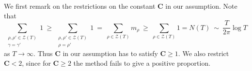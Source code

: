 \documentclass[11pt]{amsart}
\theoremstyle{remark}
\theoremstyle{plain}
\numberwithin{equation}{section}
\begin{document}
We first remark on the restrictions on the constant $\mathbf{C}$ in our assumption.
Note that
\begin{equation}\label{lower_ineq}
\sum_{\substack{\rho,\rho' \in \mathcal{Z}(T)\\ \gamma=\gamma'}} 1
~\ge~
\sum_{\substack{\rho,\rho' \in \mathcal{Z}(T)\\ \rho =\rho'}} 1
~=~
\sum_{\rho \in \mathcal{Z}(T)} m_{\rho}
~\ge~
\sum_{\rho \in \mathcal{Z}(T)} 1
= N(T)
~\sim~
\frac{T}{2\pi}\log{T}
\end{equation}
as $T\to \infty$.
Thus $\mathbf{C}$ in our assumption has to satisfy $\mathbf{C}\ge1$. We also restrict $\mathbf{C}<2$, since for $\mathbf{C}\ge 2$ the method fails to give a positive proportion. 
\end{document}

